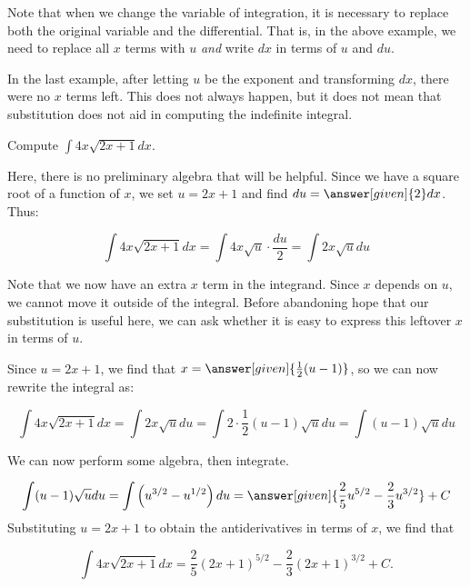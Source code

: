 \documentclass[nooutcomes]{ximera}
\begin{document}
\begin{remark}
Note that when we change the variable of integration, it is necessary to replace both the original variable and the differential.  That is, in the above example, we need to replace all $x$ terms with $u$ \emph{and} write $dx$ in terms of $u$ and $du$. 
\end{remark}

In the last example, after letting $u$ be the exponent and transforming $dx$, there were no $x$ terms left.  This does not always happen, but it does not mean that substitution does not aid in computing the indefinite integral.

\begin{example}
Compute $\int 4x \sqrt{2x+1} dx$.

\begin{explanation}
Here, there is no preliminary algebra that will be helpful.  Since we have a square root of a function of $x$, we set $u=2x+1$ and find $du = \answer[given]{2} dx$.  Thus:

\[
\int 4x \sqrt{2x+1} dx = \int 4x \sqrt{u} \cdot  \frac{du}{2} =  \int 2x \sqrt{u} du
\]

Note that we now have an extra $x$ term in the integrand.  Since $x$ depends on $u$, we cannot move it outside of the integral.  Before abandoning hope that our substitution is useful here, we can ask whether it is easy to express this leftover $x$ in terms of $u$.  

Since $u= 2x+1$, we find that $x = \answer[given]{\frac{1}{2}(u-1)}$, so we can now rewrite the integral as:

\[
\int 4x \sqrt{2x+1} dx =  \int 2x \sqrt{u} du = \int 2 \cdot \frac{1}{2}(u-1) \sqrt{u} du = \int (u-1)\sqrt{u} du
\]

We can now perform some algebra, then integrate.

\[
 \int (u-1)\sqrt{u} du = \int \left(u^{3/2} - u^{1/2} \right) du = \answer[given]{\frac{2}{5} u^{5/2} - \frac{2}{3} u^{3/2}} +C
\]
Substituting $u=2x+1$ to obtain the antiderivatives in terms of $x$, we find that

\[
\int 4x \sqrt{2x+1} dx =  \frac{2}{5} (2x+1)^{5/2} - \frac{2}{3} (2x+1)^{3/2} +C.
\]
\end{explanation}
\end{example}
\end{document}
